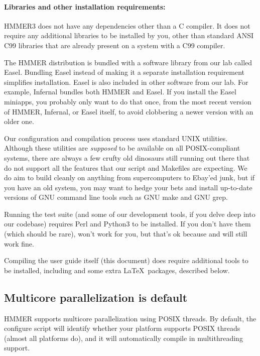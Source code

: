 \paragraph{Libraries and other installation requirements:}
HMMER3 does not have any dependencies other than a C compiler.  It
does not require any additional libraries to be installed by you,
other than standard ANSI C99 libraries that are already present on a
system with a C99 compiler.

The HMMER distribution is bundled with a software library from our lab
called Easel.
Bundling Easel instead of making it a separate installation
requirement simplifies installation. Easel is also included in other
software from our lab. For example,
Infernal
bundles both HMMER and Easel. If you install the Easel miniapps, you
probably only want to do that once, from the most recent version of
HMMER, Infernal, or Easel itself, to avoid clobbering a newer version
with an older one.

Our configuration and compilation process uses standard UNIX
utilities. Although these utilities are \emph{supposed} to be
available on all POSIX-compliant systems, there are always a few
crufty old dinosaurs still running out there that do not support all
the features that our  script and Makefiles are
expecting. We do aim to build cleanly on anything from supercomputers
to Ebay'ed junk, but if you have an old system, you may want to hedge
your bets and install up-to-date versions of GNU command line tools
such as GNU make and GNU grep.

Running the test suite (and some of our development tools, if you
delve deep into our codebase) requires Perl and Python3 to be
installed.  If you don't have them (which should be rare),  won't work for you, but that's ok because  and
 will still work fine.

Compiling the user guide itself (this document) does require
additional tools to be installed, including  and some extra
\LaTeX\ packages, described below.


\subsection{Multicore parallelization is default}

HMMER supports multicore parallelization using POSIX threads. By
default, the configure script will identify whether your platform
supports POSIX threads (almost all platforms do), and it will
automatically compile in multithreading support.

